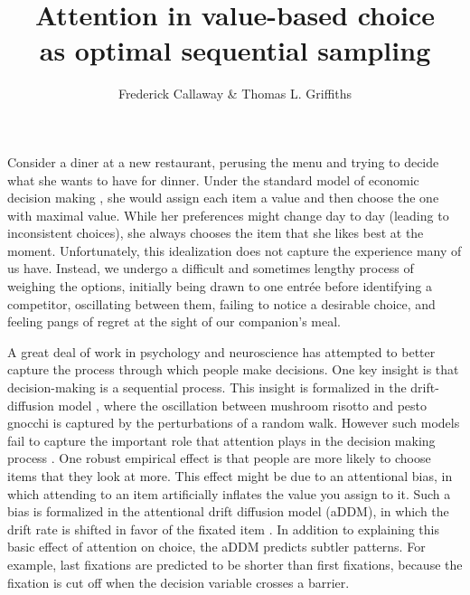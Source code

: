 \documentclass[12pt,a4paperpaper,]{article}
\title{\vspace{-2em}Attention in value-based choice\\
       as optimal sequential sampling}
\author{Frederick Callaway \& Thomas L. Griffiths}
\date{\vspace{-1em}}
\begin{document}
\maketitle




Consider a diner at a new restaurant, perusing the menu and trying to decide what she wants to have for dinner. Under the standard model of economic decision making \citep{Kahneman1979,Rangel2008}, she would assign each item a value and then choose the one with maximal value. While her preferences might change day to day (leading to inconsistent choices), she always chooses the item that she likes best at the moment. Unfortunately, this idealization does not capture the experience many of us have. Instead, we undergo a difficult and sometimes lengthy process of weighing the options, initially being drawn to one entr\'ee before identifying a competitor, oscillating between them, failing to notice a desirable choice, and feeling pangs of regret at the sight of our companion's meal.

A great deal of work in psychology and neuroscience has attempted to better capture the process through which people make decisions. One key insight is that decision-making is a sequential process. This insight is formalized in the drift-diffusion model \citep{Ratcliff1978,Milosavljevic2010}, where the oscillation between mushroom risotto and pesto gnocchi is captured by the perturbations of a random walk. However such models fail to capture the important role that attention plays in the decision making process \citep{Orquin2013}. One robust empirical effect is that people are more likely to choose items that they look at more. This effect might be due to an attentional bias, in which attending to an item artificially inflates the value you assign to it. Such a bias is formalized in the attentional drift diffusion model (aDDM), in which the drift rate is shifted in favor of the fixated item \citep{Krajbich2010}. In addition to explaining this basic effect of attention on choice, the aDDM predicts subtler patterns. For example, last fixations are predicted to be shorter than first fixations, because the fixation is cut off when the decision variable crosses a barrier.

\end{document}
